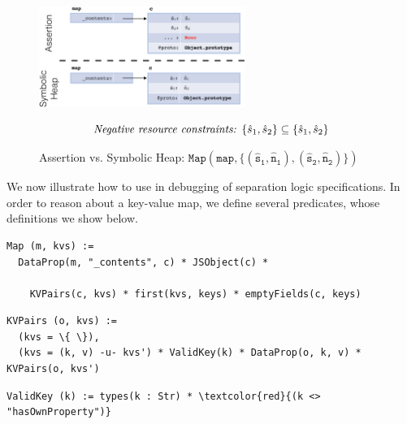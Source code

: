 \begin{figure}[t!]
\centering
\includegraphics[width=0.6\textwidth]{figures/symbvsass.png}

\vspace*{-0.7cm}
{\small $$
\text{\emph{Negative resource constraints: }} \{ \hat{s}_1, \hat{s}_2 \} \subseteq \{ \hat{s}_1, \hat{s}_2 \}
$$}
\vspace{-0.8cm}
\caption{Assertion vs. Symbolic Heap: {\small$\mathtt{Map(map, \{ (\hat{s}_1, \hat{n}_1), (\hat{s}_2, \hat{n}_2) \} )}$}}\label{fig:symb:state:versus:assertion}
\vspace{-0.5cm}
\end{figure}

We now illustrate how to use \jilette in debugging of separation logic specifications. 
In order to reason about a key-value map, we define several predicates, whose definitions we show below.

\begin{Verbatim}[fontsize=\footnotesize,commandchars=\\\{\}]
Map (m, kvs) := 
  DataProp(m, "_contents", c) * JSObject(c) * 
    
    KVPairs(c, kvs) * first(kvs, keys) * emptyFields(c, keys)
\end{Verbatim}
 \begin{Verbatim}[fontsize=\footnotesize,commandchars=\\\{\}]
KVPairs (o, kvs) := 
  (kvs = \{ \}),
  (kvs = (k, v) -u- kvs') * ValidKey(k) * DataProp(o, k, v) * KVPairs(o, kvs')
\end{Verbatim}
\begin{Verbatim}[fontsize=\footnotesize,commandchars=\\\{\}]
ValidKey (k) := types(k : Str) * \textcolor{red}{(k <> "hasOwnProperty")}
\end{Verbatim}

